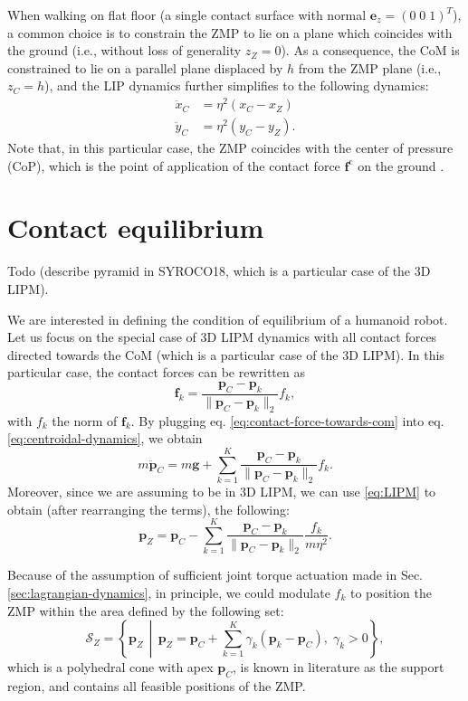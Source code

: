 When walking on flat floor (a single contact surface with normal
$\bm{e}_z=(0 \; 0\; 1)^T$),
a common choice is to constrain the ZMP to lie on
a plane which coincides with the ground (i.e., without loss of generality
$z_Z=0$). As a consequence, the CoM is constrained to lie on a parallel plane
displaced by $h$ from the ZMP plane (i.e., $z_C=h$), and
the LIP dynamics further simplifies to the following dynamics:
\begin{align*}
    \ddot{x}_C &= \eta^2 (x_C - x_Z) \\
    \ddot{y}_C &= \eta^2 (y_C - y_Z).
\end{align*}
Note that, in this particular case, the ZMP coincides with the center of
pressure (CoP), which is the point of application of the contact force
$\bm{f}^{\mathrm{c}}$ on the ground \cite{SardainBessonnet2004}.

\section{Contact equilibrium}
Todo (describe pyramid in SYROCO18, which is a particular case of the 3D LIPM).

We are interested in defining the condition of equilibrium of a humanoid robot.
Let us focus on the special case of 3D LIPM dynamics with all contact forces
directed towards the CoM (which is a particular case of the 3D LIPM).
In this particular case, the contact forces can be rewritten as
\begin{equation}
    \label{eq:contact-force-towards-com}
    \bm{f}_k = \frac{\bm{p}_C - \bm{p}_k}{\| \bm{p}_C - \bm{p}_k \|_2} f_k,
\end{equation}
with $f_k$ the norm of $\bm{f}_k$. By plugging eq.
\eqref{eq:contact-force-towards-com} into eq.
\eqref{eq:centroidal-dynamics}, we obtain
\begin{equation}
    m \ddot{\bm{p}}_C = m \bm{g} + \sum_{k=1}^K \frac{\bm{p}_C - \bm{p}_k}{\| \bm{p}_C - \bm{p}_k \|_2} f_k.
\end{equation}
Moreover, since we are assuming to be in 3D LIPM, we can use \eqref{eq:LIPM} to
obtain (after rearranging the terms), the following:
\begin{equation*}
    \bm{p}_Z = \bm{p}_C - \sum_{k=1}^K \frac{\bm{p}_C - \bm{p}_k}{\| \bm{p}_C - \bm{p}_k \|_2} \frac{f_k}{m \eta^2}.
\end{equation*}

Because of the assumption of sufficient joint torque actuation made in Sec.
\ref{sec:lagrangian-dynamics}, in principle, we could modulate $f_k$ to position
the ZMP within the area defined by the following set:
\begin{equation}
    \mathcal{S}_Z = \left\{ \bm{p}_Z \,\middle\vert\, \bm{p}_Z = \bm{p}_C + \sum_{k=1}^K \gamma_k (\bm{p}_k - \bm{p}_C), \; \gamma_k > 0  \right\},
\end{equation}
which is a polyhedral cone with apex $\bm{p}_C$,
is known in literature as the support region, and  contains all feasible
positions of the ZMP.
